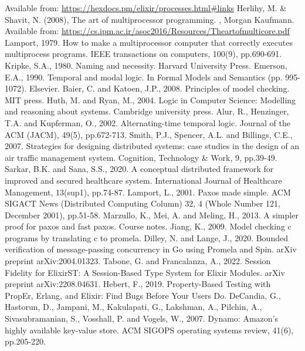 \begin{thebibliography}{9}
Available from: \url{https://hexdocs.pm/elixir/processes.html#links}
Herlihy, M. \& Shavit, N. (2008), The art of multiprocessor programming. , Morgan Kaufmann.
Available from: \url{https://cs.ipm.ac.ir/asoc2016/Resources/Theartofmulticore.pdf}
Lamport, 1979. How to make a multiprocessor computer that correctly executes multiprocess programs. IEEE transactions on computers, 100(9), pp.690-691.
Kripke, S.A., 1980. Naming and necessity. Harvard University Press.
Emerson, E.A., 1990. Temporal and modal logic. In Formal Models and Semantics (pp. 995-1072). Elsevier.
Baier, C. and Katoen, J.P., 2008. Principles of model checking. MIT press.
Huth, M. and Ryan, M., 2004. Logic in Computer Science: Modelling and reasoning about systems. Cambridge university press.
Alur, R., Henzinger, T.A. and Kupferman, O., 2002. Alternating-time temporal logic. Journal of the ACM (JACM), 49(5), pp.672-713.
Smith, P.J., Spencer, A.L. and Billings, C.E., 2007. Strategies for designing distributed systems: case studies in the design of an air traffic management system. Cognition, Technology \& Work, 9, pp.39-49.
Sarkar, B.K. and Sana, S.S., 2020. A conceptual distributed framework for improved and secured healthcare system. International Journal of Healthcare Management, 13(sup1), pp.74-87.
Lamport, L., 2001. Paxos made simple. ACM SIGACT News (Distributed Computing Column) 32, 4 (Whole Number 121, December 2001), pp.51-58.
Marzullo, K., Mei, A. and Meling, H., 2013. A simpler proof for paxos and fast paxos. Course notes.
Jiang, K., 2009. Model checking c programs by translating c to promela.
Dilley, N. and Lange, J., 2020. Bounded verification of message-passing concurrency in Go using Promela and Spin. arXiv preprint arXiv:2004.01323.
Tabone, G. and Francalanza, A., 2022. Session Fidelity for ElixirST: A Session-Based Type System for Elixir Modules. arXiv preprint arXiv:2208.04631.
Hebert, F., 2019. Property-Based Testing with PropEr, Erlang, and Elixir: Find Bugs Before Your Users Do.
DeCandia, G., Hastorun, D., Jampani, M., Kakulapati, G., Lakshman, A., Pilchin, A., Sivasubramanian, S., Vosshall, P. and Vogels, W., 2007. Dynamo: Amazon's highly available key-value store. ACM SIGOPS operating systems review, 41(6), pp.205-220.

\end{thebibliography}
